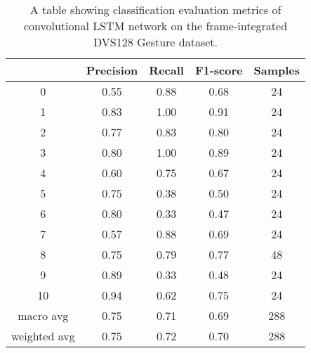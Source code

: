 \begin{table}[htb]
    \centering
    \begin{tabular}{|| c | c | c | c | c ||}
        \hline
             & Precision & Recall & F1-score & Samples \\
        \hline
        \hline
        0            & 0.55 & 0.88 & 0.68 & 24  \\
        \hline
        1            & 0.83 & 1.00 & 0.91 & 24  \\
        \hline
        2            & 0.77 & 0.83 & 0.80 & 24  \\
        \hline
        3            & 0.80 & 1.00 & 0.89 & 24  \\
        \hline
        4            & 0.60 & 0.75 & 0.67 & 24  \\
        \hline
        5            & 0.75 & 0.38 & 0.50 & 24  \\
        \hline
        6            & 0.80 & 0.33 & 0.47 & 24  \\
        \hline
        7            & 0.57 & 0.88 & 0.69 & 24  \\
        \hline
        8            & 0.75 & 0.79 & 0.77 & 48  \\
        \hline
        9            & 0.89 & 0.33 & 0.48 & 24  \\
        \hline
        10           & 0.94 & 0.62 & 0.75 & 24  \\
        \hline
        macro avg    & 0.75 & 0.71 & 0.69 & 288 \\
        \hline
        weighted avg & 0.75 & 0.72 & 0.70 & 288 \\
        \hline
    \end{tabular}
    \caption{A table showing classification evaluation metrics of convolutional LSTM network on the frame-integrated DVS128 Gesture dataset.}
    \label{tab:conv_lstm_dvs128_evaluation_metrics}
\end{table}

